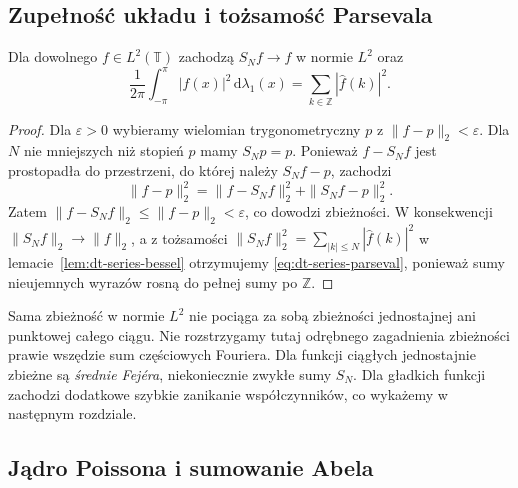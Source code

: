 \subsection{Zupełność układu i tożsamość Parsevala}

\begin{twierdzenie}
\label{thm:dt-series-parseval}
Dla dowolnego $f\in L^2(\mathbb T)$ zachodzą
$S_Nf\to f$ w normie $L^2$ oraz
\begin{equation}\label{eq:dt-series-parseval}
 \frac1{2\pi}\int_{-\pi}^{\pi}|f(x)|^2\,\mathrm d\lambda_1(x)
 =\sum_{k\in\mathbb Z}|\widehat f(k)|^2.
\end{equation}
\end{twierdzenie}
\begin{proof}
Dla $\varepsilon>0$ wybieramy wielomian trygonometryczny $p$
z $\|f-p\|_2<\varepsilon$. Dla $N$ nie mniejszych niż stopień
$p$ mamy $S_Np=p$. Ponieważ $f-S_Nf$ jest
prostopadła do przestrzeni, do której należy
$S_Nf-p$, zachodzi
\[
 \|f-p\|_2^2=\|f-S_Nf\|_2^2+\|S_Nf-p\|_2^2.
\]
Zatem $\|f-S_Nf\|_2\leq\|f-p\|_2<\varepsilon$,
co dowodzi zbieżności.
W konsekwencji $\|S_Nf\|_2\to\|f\|_2$,
a z tożsamości $\|S_Nf\|_2^2=
\sum_{|k|\leq N}|\widehat f(k)|^2$
w lemacie~\ref{lem:dt-series-bessel} otrzymujemy
\eqref{eq:dt-series-parseval}, ponieważ sumy
nieujemnych wyrazów rosną do pełnej sumy po $\mathbb Z$.
\end{proof}

\begin{uwaga}
Sama zbieżność w normie $L^2$ nie pociąga
za sobą zbieżności jednostajnej ani punktowej
całego ciągu. Nie rozstrzygamy tutaj odrębnego
zagadnienia zbieżności prawie wszędzie sum
częściowych Fouriera. Dla funkcji ciągłych jednostajnie zbieżne są
\emph{średnie Fejéra}, niekoniecznie zwykłe sumy $S_N$.
Dla gładkich funkcji zachodzi dodatkowe szybkie zanikanie
współczynników, co wykażemy w następnym rozdziale.
\end{uwaga}

\subsection{Jądro Poissona i sumowanie Abela}


